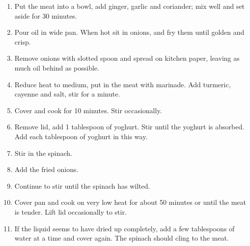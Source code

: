 \documentclass[11pt,a4paper]{article}
\begin{document}
\begin{enumerate}
  \item Put the meat into a bowl, add ginger, garlic and coriander; mix well and set aside for 30 minutes.
  \item Pour oil in wide pan. When hot sit in onions, and fry them until golden and crisp.
  \item Remove onions with slotted spoon and spread on kitchen paper, leaving as much oil behind as possible.
  \item Reduce heat to medium, put in the meat with marinade. Add turmeric, cayenne and salt, stir for a minute.
  \item Cover and cook for 10 minutes. Stir occasionally.
  \item Remove lid, add 1 tablespoon of yoghurt. Stir until the yoghurt is absorbed. Add each tablespoon of yoghurt in this way.
  \item Stir in the spinach.
  \item Add the fried onions.
  \item Continue to stir until the spinach has wilted.
  \item Cover pan and cook on very low heat for about 50 minutes or until the meat is tender. Lift lid occasionally to stir.
  \item If the liquid seems to have dried up completely, add a few tablespoons of water at a time and cover again. The spinach should cling to the meat.
  
\end{enumerate}
\end{document}
